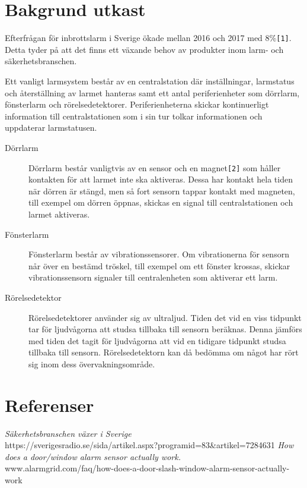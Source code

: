 \documentclass[a4paper]{article}
\begin{document}
\section{Bakgrund utkast}

Efterfrågan för inbrottslarm i Sverige ökade mellan 2016 och 2017 med 8\%\texttt{[1]}. Detta tyder på att det finns ett växande behov av produkter inom larm- och säkerhetsbranschen.

Ett vanligt larmsystem består av en centralstation där inställningar, larmstatus och återställning av larmet hanteras samt ett antal periferienheter som dörrlarm, fönsterlarm och rörelsedetektorer. Periferienheterna skickar kontinuerligt information till centralstationen som i sin tur tolkar informationen och uppdaterar larmstatusen.

\begin{description}
\item [Dörrlarm] Dörrlarm består vanligtvis av en sensor och en magnet\texttt{[2]} som håller kontakten för att larmet inte ska aktiveras. Dessa har kontakt hela tiden när dörren är stängd, men så fort sensorn tappar kontakt med magneten, till exempel om dörren öppnas, skickas en signal till centralstationen och larmet aktiveras.
\item [Fönsterlarm] Fönsterlarm består av vibrationssensorer. Om vibrationerna för sensorn når över en bestämd tröskel, till exempel om ett fönster krossas, skickar vibrationssensorn signaler till centralenheten som aktiverar ett larm.
\item [Rörelsedetektor] Rörelsedetektorer använder sig av ultraljud. Tiden det vid en viss tidpunkt tar för ljudvågorna att studsa tillbaka till sensorn beräknas. Denna jämförs med tiden det tagit för ljudvågorna att vid en tidigare tidpunkt studsa tillbaka till sensorn. Rörelsedetektorn kan då bedömma om något har rört sig inom dess övervakningsområde.
\end{description}

\section{Referenser}
\begin{thebibliography}{9}
\bibitem{[1]}
\textit{Säkerhetsbranschen växer i Sverige} \\https://sverigesradio.se/sida/artikel.aspx?programid=83\&artikel=7284631
\bibitem{[2]}
\textit{How does a door/window alarm sensor actually work.} \\www.alarmgrid.com/faq/how-does-a-door-slash-window-alarm-sensor-actually-work
\end{thebibliography}
\end{document}
